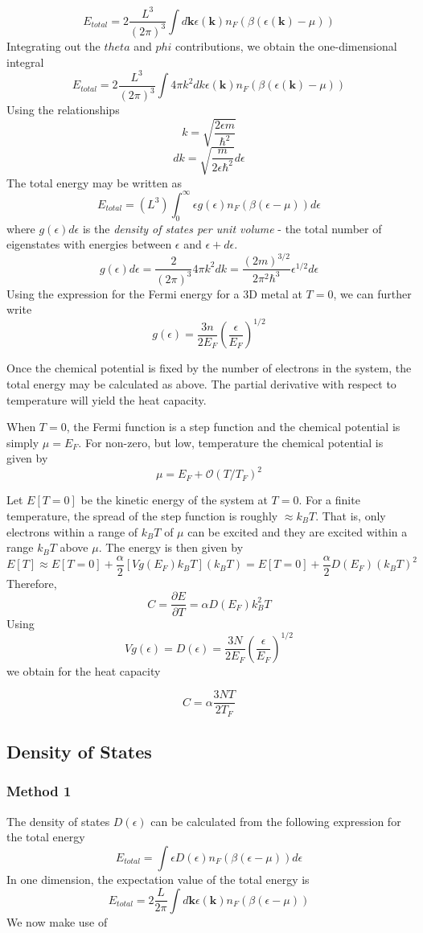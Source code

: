 \documentclass[10pt]{article}
\begin{document}
$$
E_{total} = 2\frac{L^{3}}{(2\pi)^{3}}\int d\textbf{k} \epsilon(\textbf{k})n_{F}(\beta(\epsilon(\textbf{k}) - \mu))
$$
Integrating out the $theta$ and $phi$ contributions, we obtain the one-dimensional integral
$$
E_{total} = 2\frac{L^{3}}{(2\pi)^{3}}\int 4\pi k^{2} dk \epsilon(\textbf{k})n_{F}(\beta(\epsilon(\textbf{k}) - \mu))
$$
Using the relationships
$$
k = \sqrt{\frac{2\epsilon m}{\hbar^{2}}}
$$
$$
dk = \sqrt{\frac{m}{2\epsilon \hbar^{2}}}d\epsilon
$$
The total energy may be written as
$$
E_{total} = (L^{3}) \int_{0}^{\infty} \epsilon  g(\epsilon)  n_{F}(\beta(\epsilon-\mu))d\epsilon
$$
where $g(\epsilon)d\epsilon$ is the \emph{density of states per unit volume} - the total number of eigenstates with energies between $\epsilon$
and $\epsilon + d\epsilon$.
$$g(\epsilon)d\epsilon = \frac{2}{(2\pi)^{3}}4\pi k^{2}dk = \frac{(2m)^{3/2}}{2\pi^{2}\hbar^{3}}\epsilon^{1/2}d\epsilon$$
Using the expression for the Fermi energy for a 3D metal at $T=0$, we can further write
$$
g(\epsilon) = \frac{3n}{2E_{F}} \left (\frac{\epsilon}{E_{F}} \right)^{1/2}
$$

Once the chemical potential is fixed by the number of electrons in the system, the total energy may be calculated
as above. The partial derivative with respect to temperature will yield the heat capacity.

When $T = 0$, the Fermi function is a step function and the chemical potential is simply $\mu = E_{F}$.
For non-zero, but low, temperature the chemical potential is given by
$$\mu = E_{F} + \mathcal{O}(T/T_{F})^{2}$$

Let $E[T=0]$ be the kinetic energy of the system at $T=0$. For a finite temperature, the spread of the step function is roughly $\approx k_{B}T$.
That is, only electrons within a range of $k_{B}T$ of $\mu$ can be excited and they are excited within a range $k_{B}T$ above $\mu$.
The energy is then given by
$$E[T] \approx E[T=0] + \frac{\alpha}{2}[Vg(E_{F})k_{B}T](k_{B}T) = E[T=0] + \frac{\alpha}{2}D(E_{F})(k_{B}T)^{2}$$
Therefore,
$$
C = \frac{\partial E}{\partial T} = \alpha D(E_{F})k_{B}^{2}T
$$
Using
$$Vg(\epsilon) = D(\epsilon) = \frac{3N}{2E_{F}}\left ( \frac{\epsilon}{E_{F}}\right )^{1/2}$$
we obtain for the heat capacity

$$
C = \alpha \frac{3NT}{2T_{F}}
$$

\subsection{Density of States}

\subsubsection{Method 1}
The density of states $D(\epsilon)$ can be calculated from the following expression for the total energy
$$
E_{total} = \int \epsilon D(\epsilon) n_{F}(\beta(\epsilon - \mu)) d\epsilon
$$
In one dimension, the expectation value of the total energy is
$$E_{total} = 2\frac{L}{2\pi}\int d\textbf{k} \epsilon(\textbf{k}) n_{F}(\beta(\epsilon - \mu))  $$
We now make use of
\end{document}
